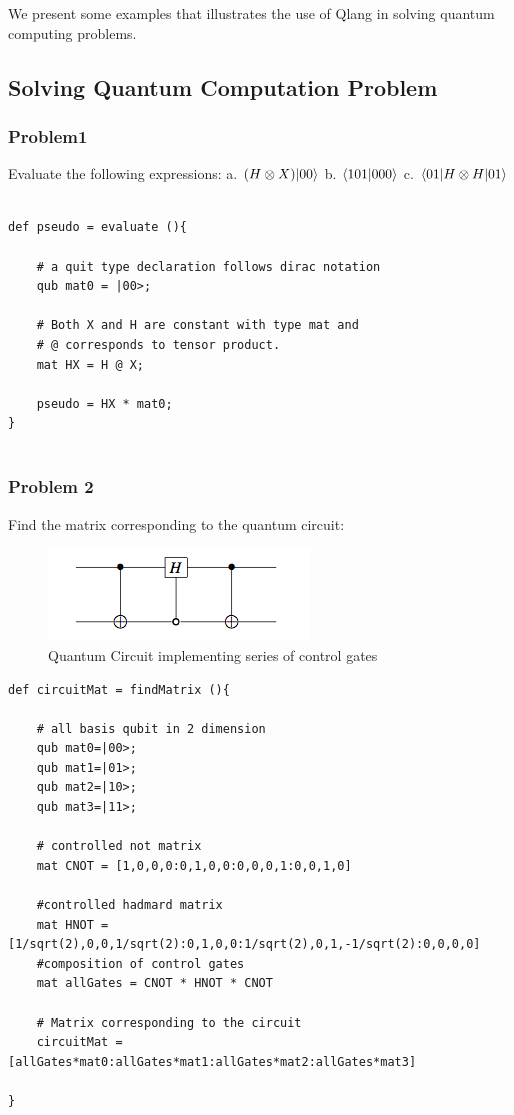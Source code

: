 We present some examples that illustrates the use of Qlang in solving quantum computing problems.

\subsection { Solving Quantum Computation Problem}
\subsubsection{Problem1}
Evaluate the following expressions: a. $(H \otimes X) |00\rangle$ b. $\dotproduct[101,000]$ c. $\langle 01| H \otimes H |01\rangle $
\begin{lstlisting}
	
def pseudo = evaluate (){
		
	# a quit type declaration follows dirac notation
	qub mat0 = |00>;
		
	# Both X and H are constant with type mat and
	# @ corresponds to tensor product.
	mat HX = H @ X;
		
	pseudo = HX * mat0;
}
	
\end{lstlisting}

\subsubsection{Problem 2}
Find the matrix corresponding to the quantum circuit:
\begin{figure}[h!]
\begin{center}
\includegraphics{ref/circuit1}
\end{center}
\caption{ Quantum Circuit implementing series of control gates\label{cir1}}
\end{figure}

\begin{lstlisting}
def circuitMat = findMatrix (){
	
	# all basis qubit in 2 dimension
	qub mat0=|00>;
	qub mat1=|01>;
	qub mat2=|10>;
	qub mat3=|11>;
	
	# controlled not matrix	
	mat CNOT = [1,0,0,0:0,1,0,0:0,0,0,1:0,0,1,0]
	
	#controlled hadmard matrix
	mat HNOT = [1/sqrt(2),0,0,1/sqrt(2):0,1,0,0:1/sqrt(2),0,1,-1/sqrt(2):0,0,0,0]
	#composition of control gates
	mat allGates = CNOT * HNOT * CNOT
	
	# Matrix corresponding to the circuit	
	circuitMat =[allGates*mat0:allGates*mat1:allGates*mat2:allGates*mat3]
		
}
\end{lstlisting}
